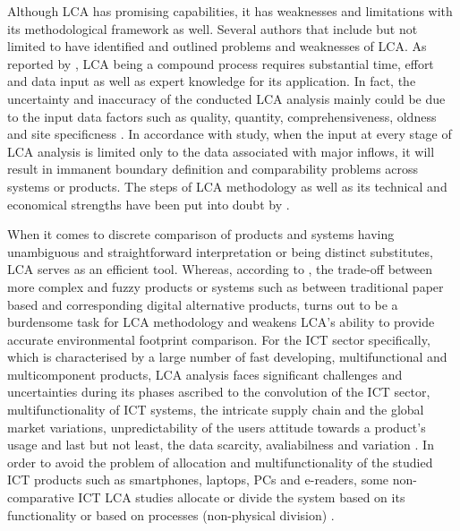 \documentclass[conference]{IEEEtran}
\begin{document}
Although LCA has promising capabilities, it has weaknesses and limitations with its methodological framework as well. Several authors that include but not limited to \cite{joshi1999product, reap2008survey, owens1997life, finnveden1997valuation, arnold1993life, arnold1995environmental, hermann2007assessing} have identified and outlined problems and weaknesses of LCA. As reported by \cite{hermann2007assessing}, LCA being a compound process requires substantial time, effort and data input as well as expert knowledge for its application. In fact, the uncertainty and inaccuracy of the conducted LCA analysis mainly could be due to the input data factors such as quality, quantity, comprehensiveness, oldness  and site specificness \cite{curran2005international, reap2008survey}. In accordance with \cite{joshi1999product} study, when the input at every stage of LCA analysis is limited only to the data associated with major inflows, it will result in immanent boundary definition and comparability problems across systems or products. The steps of LCA methodology as well as its technical and economical strengths have been put into doubt by \cite{finnveden1997valuation, arnold1993life, arnold1995environmental}.

When  it  comes  to  discrete  comparison  of  products  and systems having  unambiguous  and  straightforward  interpretation  or  being distinct  substitutes,  LCA  serves  as  an  efficient tool.  Whereas, according  to  \cite{Bull201410, reap2008survey}, the  trade-off  between more complex and fuzzy products or systems such as between traditional  paper  based  and  corresponding  digital  alternative products, turns out to be a burdensome task for LCA methodology and weakens LCA’s ability to provide accurate environmental  footprint  comparison.  For  the  ICT  sector  specifically, which  is  characterised  by  a  large  number  of  fast  developing, multifunctional  and  multicomponent products,  LCA  analysis faces significant challenges and uncertainties during its phases ascribed to the convolution of the ICT sector, multifunctionality of  ICT  systems, the  intricate  supply  chain  and  the  global market variations, unpredictability of the users attitude towards a  product’s  usage  and  last  but  not  least,  the  data  scarcity, avaliabilness  and  variation \cite{guldbrandsson2012opportunities, Bull201410, farrant2012environmental, enroth2009}. In order to avoid the problem of allocation and multifunctionality of the studied ICT products such as smartphones, laptops, PCs and e-readers, some non-comparative ICT LCA studies allocate or divide the system based on its functionality or based on processes (non-physical division) \cite{choi2006life,frey2006ecological,lu2006balancing, ekvall2001allocation}. 
\end{document}
